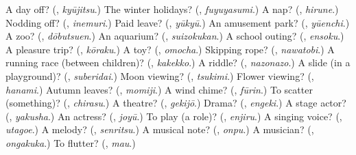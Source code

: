 \begin{tcolorbox}[breakable,colback=teal!4,colframe=teal!35!black,title={Before you move on}]
A day off? (\textbf{}, \emph{kyūjitsu}.) The winter holidays? (\textbf{}, \emph{fuyuyasumi}.) A nap? (\textbf{}, \emph{hirune}.) Nodding off? (\textbf{}, \emph{inemuri}.) Paid leave? (\textbf{}, \emph{yūkyū}.) An amusement park? (\textbf{}, \emph{yūenchi}.) A zoo? (\textbf{}, \emph{dōbutsuen}.) An aquarium? (\textbf{}, \emph{suizokukan}.) A school outing? (\textbf{}, \emph{ensoku}.) A pleasure trip? (\textbf{}, \emph{kōraku}.) A toy? (\textbf{}, \emph{omocha}.) Skipping rope? (\textbf{}, \emph{nawatobi}.) A running race (between children)? (\textbf{}, \emph{kakekko}.) A riddle? (\textbf{}, \emph{nazonazo}.) A slide (in a playground)? (\textbf{}, \emph{suberidai}.) Moon viewing? (\textbf{}, \emph{tsukimi}.) Flower viewing? (\textbf{}, \emph{hanami}.) Autumn leaves? (\textbf{}, \emph{momiji}.) A wind chime? (\textbf{}, \emph{fūrin}.) To scatter (something)? (\textbf{}, \emph{chirasu}.) A theatre? (\textbf{}, \emph{gekijō}.) Drama? (\textbf{}, \emph{engeki}.) A stage actor? (\textbf{}, \emph{yakusha}.) An actress? (\textbf{}, \emph{joyū}.) To play (a role)? (\textbf{}, \emph{enjiru}.) A singing voice? (\textbf{}, \emph{utagoe}.) A melody? (\textbf{}, \emph{senritsu}.) A musical note? (\textbf{}, \emph{onpu}.) A musician? (\textbf{}, \emph{ongakuka}.) To flutter? (\textbf{}, \emph{mau}.)
\end{tcolorbox}
